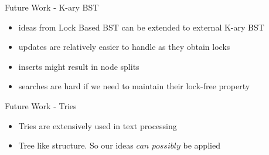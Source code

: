 \documentclass{beamer}
\begin{document}
\begin{frame}{Future Work - K-ary BST}
\begin{itemize}
\item ideas from Lock Based BST can be extended to external K-ary BST
\item updates are relatively easier to handle as they obtain locks
\item inserts might result in  node splits
\item searches are hard if we need to maintain their lock-free property
\end{itemize}
\end{frame}

\begin{frame}{Future Work - Tries}
\begin{itemize}
\item Tries are extensively used in text processing
\item Tree like structure. So our ideas $can$ $possibly$ be applied
\end{itemize}
\end{frame}
\end{document}
